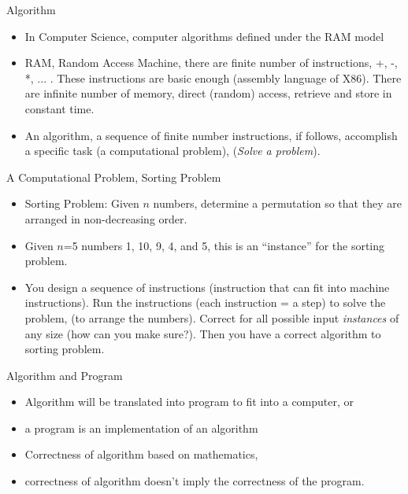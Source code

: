 \documentclass{beamer}
\begin{document}
\begin{frame}{}
\begin{center}
{\large Algorithm}
\end{center}
\begin{itemize}
\item In Computer Science, computer algorithms defined under the RAM model
\item RAM, Random Access Machine, there are finite number of instructions,
  +, -, *, ... .  These instructions are basic enough (assembly language
 of X86).  There are infinite number of memory, direct (random) 
access, retrieve and store in constant time.  
\item An algorithm, a sequence of finite number instructions, if follows,
 accomplish a specific task (a computational problem), ({\it Solve a problem}). 
\end{itemize}
\end{frame}

\begin{frame}{}
\begin{center}
A Computational Problem, Sorting Problem
\end{center}
\begin{itemize}
\item Sorting Problem: Given $n$ numbers, determine a permutation so that they are arranged in
 non-decreasing order. 
\item Given $n$=5 numbers 1, 10, 9, 4, and 5, this is an ``instance'' for the sorting problem.  
\item {\small You design a sequence of instructions (instruction that can fit
 into machine instructions).  Run the instructions (each instruction = a step) to solve the problem,
 (to arrange the numbers).  Correct for all possible input {\it instances}
 of any size (how can you make sure?).  Then you have a correct algorithm to 
 sorting problem.  }
\end{itemize}
\end{frame}

\begin{frame}{}
\begin{center}
Algorithm and Program
\end{center}
\begin{itemize}
\item Algorithm will be translated into program to fit into a computer, or
\item a program is an implementation of an algorithm
\item Correctness of algorithm based on mathematics,
\item correctness of algorithm doesn't imply the correctness of the
 program.  
\end{itemize}
\end{frame}
\end{document}
